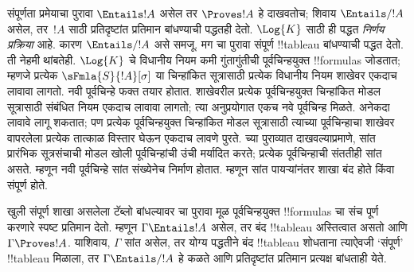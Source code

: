 \documentclass[../../../include/open-logic-section]{subfiles}
\begin{document}


\begin{explain}
  संपूर्णता प्रमेयाचा पुरावा
  $\Entails !A$ असेल तर $\Proves !A$
  हे दाखवतोच; शिवाय $\Entails/ !A$
  असेल, तर~$!A$ साठी प्रतिदृष्टांत
  प्रतिमान बांधण्याची पद्धतही देतो.
  $\Log{K}$ साठी ही पद्धत
  \emph{निर्णय प्रक्रिया} आहे. कारण
  $\Entails/ !A$ असे समजू. मग
   चा
  पुरावा संपूर्ण !!{tableau} बांधण्याची
  पद्धत देतो. ती नेहमी थांबतेही.
  $\Log{K}$ चे विधानीय नियम कमी गुंतागुंतीची
  पूर्वचिन्हयुक्त !!{formula}s जोडतात;
  म्हणजे प्रत्येक
  $\sFmla{S}{!A}[\sigma]$ या चिन्हांकित
  सूत्रासाठी प्रत्येक विधानीय नियम
  शाखेवर एकदाच लावावा लागतो.
  नवी पूर्वचिन्हे फक्त
  तयार होतात. शाखेवरील प्रत्येक पूर्वचिन्हयुक्त
  चिन्हांकित मोडल सूत्रासाठी संबंधित नियम
  एकदाच लावावा लागतो; त्या अनुप्रयोगात
  एकच नवे पूर्वचिन्ह मिळते.
  अनेकदा लावावे लागू शकतात; पण प्रत्येक
  पूर्वचिन्हयुक्त चिन्हांकित मोडल सूत्रासाठी
  त्याच्या पूर्वचिन्हाचा शाखेवर वापरलेला प्रत्येक
  तात्काळ विस्तार घेऊन एकदाच लावणे पुरते.
   च्या पुराव्यात
  दाखवल्याप्रमाणे, सांत प्रारंभिक सूत्रसंचाची मोडल
  खोली पूर्वचिन्हांची उंची मर्यादित करते; प्रत्येक
  पूर्वचिन्हाची संततीही सांत असते. म्हणून नवी
  पूर्वचिन्हे सांत संख्येनेच निर्माण होतात. म्हणून
  सांत पायऱ्यांनंतर शाखा बंद होते किंवा
  संपूर्ण होते.

  खुली संपूर्ण शाखा असलेला टॅब्लो
  बांधल्यावर 
  चा पुरावा मूळ पूर्वचिन्हयुक्त !!{formula}s
  चा संच पूर्ण करणारे स्पष्ट प्रतिमान देतो.
  म्हणून $\Gamma \Entails !A$ असेल, तर
  बंद !!{tableau} अस्तित्वात असतो आणि
  $\Gamma \Proves !A$. याशिवाय, $\Gamma$ सांत
  असेल, तर योग्य पद्धतीने बंद !!{tableau} शोधताना
  त्याऐवजी ‘संपूर्ण’ !!{tableau} मिळाला,
  तर $\Gamma \Entails/ !A$ हे कळते
  आणि प्रतिदृष्टांत प्रतिमान प्रत्यक्ष
  बांधताही येते.
\end{explain}
\end{document}
